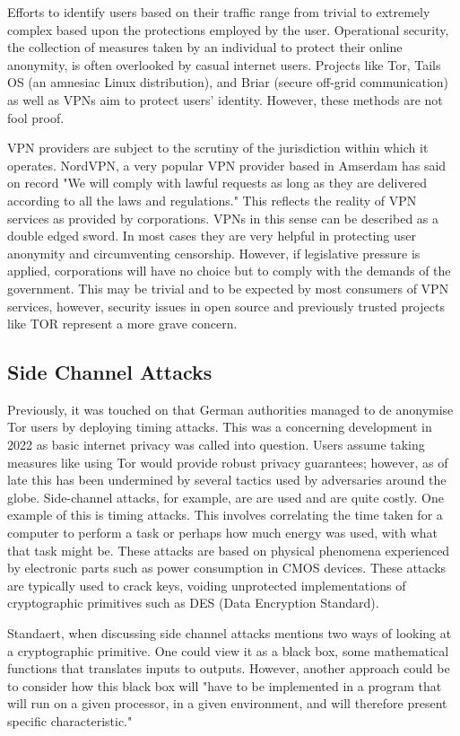 Efforts to identify users based on their traffic range from trivial to extremely complex based upon the protections employed by the user. Operational security, the collection of measures taken by an individual to protect their online anonymity, is often overlooked by casual internet users. Projects like Tor, Tails OS (an amnesiac Linux distribution), and Briar (secure off-grid communication) as well as VPNs aim to protect users’ identity. However, these methods are not fool proof. 

VPN providers are subject to the scrutiny of the jurisdiction within which it operates. NordVPN, a very popular VPN provider based in Amserdam has said on record "We will comply with lawful requests as long as they are delivered according to all the laws and regulations." This reflects the reality of VPN services as provided by corporations. VPNs in this sense can be described as a double edged sword. In most cases they are very helpful in protecting user anonymity and circumventing censorship. However, if legislative pressure is applied, corporations will have no choice but to comply with the demands of the government. This may be trivial and to be expected by most consumers of VPN services, however, security issues in open source and previously trusted projects like TOR represent a more grave concern. 

\subsection{Side Channel Attacks}
Previously, it was touched on that German authorities managed to de anonymise Tor users by deploying timing attacks. This was a concerning development in 2022 as basic internet privacy was called into question. Users assume taking measures like using Tor would provide robust privacy guarantees; however, as of late this has been undermined by several tactics used by adversaries around the globe. Side-channel attacks, for example, are are used and are quite costly. One example of this is timing attacks. This involves correlating the time taken for a computer to perform a task or perhaps how much energy was used, with what that task might be. These attacks are based on physical phenomena experienced by electronic parts such as power consumption in CMOS devices. These attacks are typically used to crack keys, voiding unprotected implementations of cryptographic primitives such as DES (Data Encryption Standard).

Standaert, when discussing side channel attacks mentions two ways of looking at a cryptographic primitive. One could view it as a black box, some mathematical functions that translates inputs to outputs. However, another approach could be to consider how this black box will "have to be implemented in a program that will run on a given processor, in a given environment, and will therefore present specific characteristic." \cite{standaert2005introduction} 

